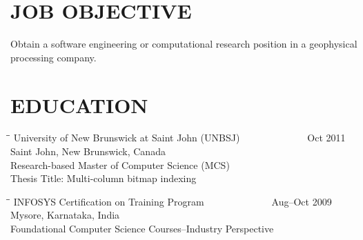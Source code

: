 \documentclass{res}
\begin{document}
 

\address{\bf  PRESENT ADDRESS\\19603 Fernhaven \\Katy, TX 77449\\(281) 398-9692}
                                  
\begin{resume}

\section{JOB OBJECTIVE}          
   \vspace{0.05 in}
Obtain a software engineering or computational research position in a geophysical processing company.
\section{EDUCATION}
   \vspace{0.05 in}
   
   \begin{tabbing}
   \hspace{2.3in}\= \hspace{2.6in}\= \kill %
        University of New Brunswick at Saint John (UNBSJ)\> ~~~~~~ \> ~~~~~~ Oct 2011\\
        Saint John, New Brunswick, Canada\\
        Research-based Master of Computer Science (MCS)\\
        Thesis Title: Multi-column bitmap indexing\\
   \end{tabbing}\vspace{-20pt}      %
   
   \begin{tabbing}
   \hspace{2.3in}\= \hspace{2.6in}\= \kill %
        INFOSYS Certification on Training Program\> ~~~~~~ \> ~~~~~~ Aug--Oct 2009\\
        Mysore, Karnataka, India\\
        Foundational Computer Science Courses--Industry Perspective\\
   \end{tabbing}\vspace{-20pt}      %


\end{resume}
\end{document}

